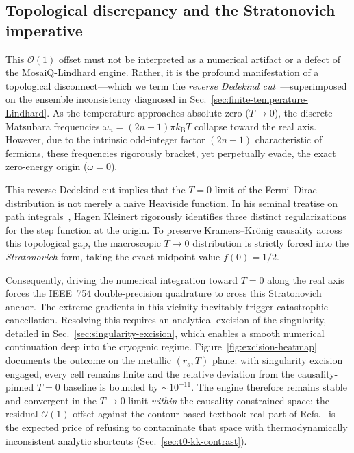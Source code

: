 \documentclass[aps,showkeys,noshowpacs,superscriptaddress,pre,preprint]{revtex4-2}
\let\label\orilabel
\begin{document}
\subsection{Topological discrepancy and the Stratonovich imperative}
\label{sec:stratonovich-imperative}

This $\mathcal{O}(1)$ offset must not be interpreted as a numerical artifact or a defect of the MosaiQ-Lindhard engine.
Rather, it is the profound manifestation of a topological disconnect---which we term the \emph{reverse Dedekind cut}~\cite{Dedekind1872,Rudin1976_Cut}---superimposed on the ensemble inconsistency diagnosed in Sec.~\ref{sec:finite-temperature-Lindhard}.
As the temperature approaches absolute zero ($T \to 0$), the discrete Matsubara frequencies $\omega_n = (2n+1)\pi k_\mathrm{B} T$ collapse toward the real axis.
However, due to the intrinsic odd-integer factor $(2n+1)$ characteristic of fermions, these frequencies rigorously bracket, yet perpetually evade, the exact zero-energy origin ($\omega = 0$).

This reverse Dedekind cut implies that the $T=0$ limit of the Fermi--Dirac distribution is not merely a naive Heaviside function.
In his seminal treatise on path integrals~\cite{Kleinert2009}, Hagen Kleinert rigorously identifies three distinct regularizations for the step function at the origin.
To preserve Kramers--Kr\"onig causality across this topological gap, the macroscopic $T \to 0$ distribution is strictly forced into the \emph{Stratonovich} form, taking the exact midpoint value $f(0) = 1/2$.

Consequently, driving the numerical integration toward $T=0$ along the real axis forces the IEEE~754 double-precision quadrature to cross this Stratonovich anchor.
The extreme gradients in this vicinity inevitably trigger catastrophic cancellation.
Resolving this requires an analytical excision of the singularity, detailed in Sec.~\ref{sec:singularity-excision}, which enables a smooth numerical continuation deep into the cryogenic regime.
Figure~\ref{fig:excision-heatmap} documents the outcome on the metallic $(r_s, T)$ plane: with singularity excision engaged, every cell remains finite and the relative deviation from the causality-pinned $T=0$ baseline is bounded by $\sim 10^{-11}$.
The engine therefore remains stable and convergent in the $T \rightarrow 0$ limit \emph{within} the causality-constrained space;
the residual $\mathcal{O}(1)$ offset against the contour-based textbook real part of Refs.~\cite{Giuliani-Vignale2005,Gouedard-Deutsch1978} is the expected price of refusing to contaminate that space with thermodynamically inconsistent analytic shortcuts (Sec.~\ref{sec:t0-kk-contrast}).
\end{document}
